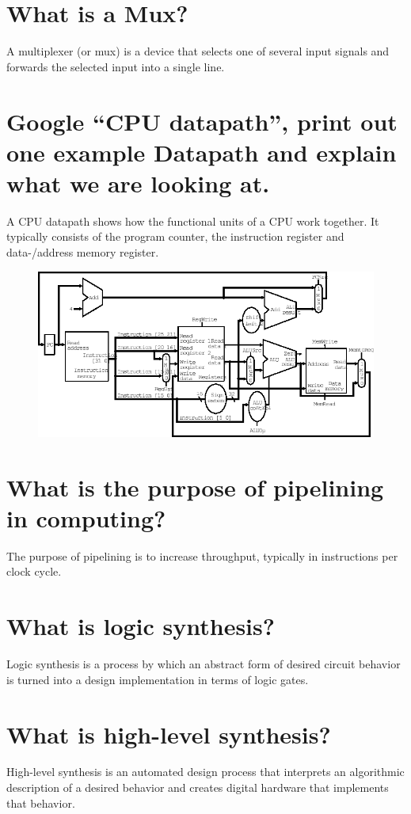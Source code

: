 \documentclass{article}
\begin{document}
\section{What is a Mux?}
A multiplexer (or mux) is a device that selects one of several input
signals and forwards the selected input into a single line.

\section{Google “CPU datapath”, print out one example Datapath and
  explain what we are looking at.}
A CPU datapath shows how the functional units of a CPU work
together. It typically consists of the program counter, the
instruction register and data-/address memory register.

\begin{figure}[hbp]
  \centering
  \includegraphics[width=\textwidth]{images/cpu-datapath}
\end{figure}

\section{What is the purpose of pipelining in computing?}
The purpose of pipelining is to increase throughput, typically in
instructions per clock cycle.

\section{What is logic synthesis?}
Logic synthesis is a process by which an abstract form of desired
circuit behavior is turned into a design implementation in terms of
logic gates.

\section{What is high-level synthesis?}
High-level synthesis is an automated design process that interprets an
algorithmic description of a desired behavior and creates digital
hardware that implements that behavior.
\end{document}
